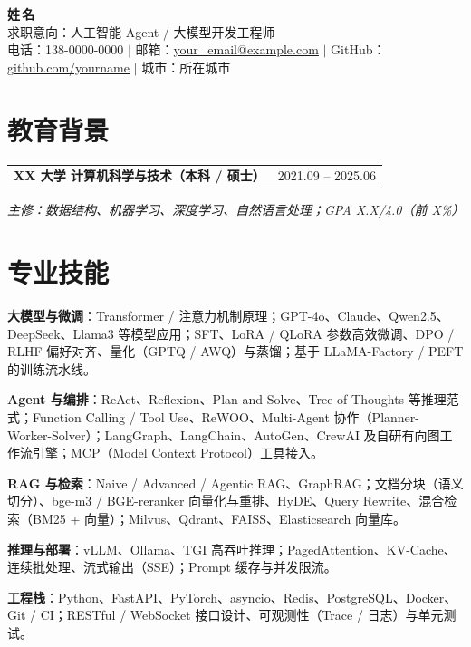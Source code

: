 \documentclass[9pt,a4paper]{article}
\makeatletter
\newcommand{\entry}[2]{%
  \par\vspace{2pt}%
  \begin{tabularx}{\textwidth}{@{}X@{}r@{}}
    \textbf{#1} & {\color{rulegray}\small #2}
  \end{tabularx}%
  \par}
\newcommand{\subentry}[1]{{\color{accent}\small\itshape #1}\par\vspace{1pt}}
\makeatother
\begin{document}
\begin{center}
  {\Huge\bfseries\sffamily\color{primary} 姓\,名}\\[4pt]
  {\color{accent}\sffamily 求职意向：人工智能 Agent / 大模型开发工程师}\\[5pt]
  \small
  电话：138-0000-0000 \quad$\vert$\quad
  邮箱：\href{mailto:your_email@example.com}{your\_email@example.com} \quad$\vert$\quad
  GitHub：\href{https://github.com/}{github.com/yourname} \quad$\vert$\quad
  城市：所在城市
\end{center}
\vspace{2pt}

\section{教育背景}
\entry{XX 大学 \quad 计算机科学与技术（本科 / 硕士）}{2021.09 -- 2025.06}
\subentry{主修：数据结构、机器学习、深度学习、自然语言处理；GPA X.X/4.0（前 X\%）}

\section{专业技能}
\begin{tight}
  \item \textbf{大模型与微调}：Transformer / 注意力机制原理；GPT-4o、Claude、Qwen2.5、DeepSeek、Llama3 等模型应用；SFT、LoRA / QLoRA 参数高效微调、DPO / RLHF 偏好对齐、量化（GPTQ / AWQ）与蒸馏；基于 LLaMA-Factory / PEFT 的训练流水线。
  \item \textbf{Agent 与编排}：ReAct、Reflexion、Plan-and-Solve、Tree-of-Thoughts 等推理范式；Function Calling / Tool Use、ReWOO、Multi-Agent 协作（Planner-Worker-Solver）；LangGraph、LangChain、AutoGen、CrewAI 及自研有向图工作流引擎；MCP（Model Context Protocol）工具接入。
  \item \textbf{RAG 与检索}：Naive / Advanced / Agentic RAG、GraphRAG；文档分块（语义切分）、bge-m3 / BGE-reranker 向量化与重排、HyDE、Query Rewrite、混合检索（BM25 + 向量）；Milvus、Qdrant、FAISS、Elasticsearch 向量库。
  \item \textbf{推理与部署}：vLLM、Ollama、TGI 高吞吐推理；PagedAttention、KV-Cache、连续批处理、流式输出（SSE）；Prompt 缓存与并发限流。
  \item \textbf{工程栈}：Python、FastAPI、PyTorch、asyncio、Redis、PostgreSQL、Docker、Git / CI；RESTful / WebSocket 接口设计、可观测性（Trace / 日志）与单元测试。
\end{tight}
\end{document}
